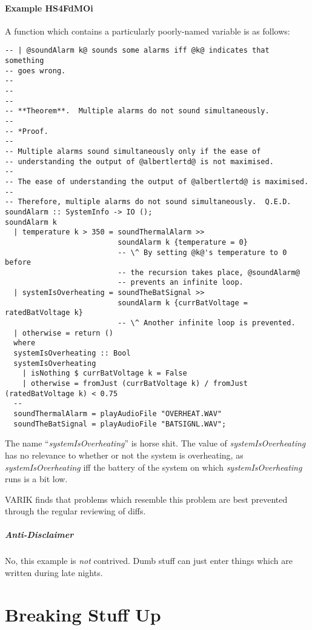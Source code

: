 \documentclass{report}
\begin{document}
\subsubsection{Example HS4FdMOi}
A function which contains a particularly poorly-named variable is as follows:
\begin{lstlisting}
-- | @soundAlarm k@ sounds some alarms iff @k@ indicates that something
-- goes wrong.
--
--
--
-- **Theorem**.  Multiple alarms do not sound simultaneously.
--
-- *Proof.
--
-- Multiple alarms sound simultaneously only if the ease of
-- understanding the output of @albertlertd@ is not maximised.
--
-- The ease of understanding the output of @albertlertd@ is maximised.
--
-- Therefore, multiple alarms do not sound simultaneously.  Q.E.D.
soundAlarm :: SystemInfo -> IO ();
soundAlarm k
  | temperature k > 350 = soundThermalAlarm >>
                          soundAlarm k {temperature = 0}
                          -- \^ By setting @k@'s temperature to 0 before
                          -- the recursion takes place, @soundAlarm@
                          -- prevents an infinite loop.
  | systemIsOverheating = soundTheBatSignal >>
                          soundAlarm k {currBatVoltage = ratedBatVoltage k}
                          -- \^ Another infinite loop is prevented.
  | otherwise = return ()
  where
  systemIsOverheating :: Bool
  systemIsOverheating
    | isNothing $ currBatVoltage k = False
    | otherwise = fromJust (currBatVoltage k) / fromJust (ratedBatVoltage k) < 0.75
  --
  soundThermalAlarm = playAudioFile "OVERHEAT.WAV"
  soundTheBatSignal = playAudioFile "BATSIGNL.WAV";
\end{lstlisting}
The name ``\textit{systemIsOverheating}'' is horse shit.  The value of \textit{systemIsOverheating} has no relevance to whether or not the system is overheating, as \textit{systemIsOverheating} iff the battery of the system on which \textit{systemIsOverheating} runs is a bit low.

VARIK finds that problems which resemble this problem are best prevented through the regular reviewing of diffs.

\paragraph{Anti-Disclaimer}
No, this example is \textit{not} contrived.  Dumb stuff can just enter things which are written during late nights.
\chapter{Breaking Stuff Up}
\end{document}
